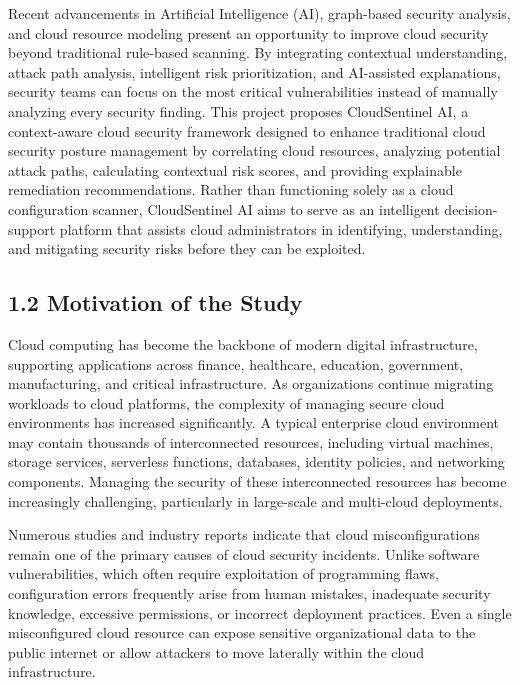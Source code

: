Recent advancements in Artificial Intelligence (AI), graph-based security analysis, and cloud resource modeling present an opportunity to improve cloud security beyond traditional rule-based scanning. By integrating contextual understanding, attack path analysis, intelligent risk prioritization, and AI-assisted explanations, security teams can focus on the most critical vulnerabilities instead of manually analyzing every security finding. This project proposes CloudSentinel AI, a context-aware cloud security framework designed to enhance traditional cloud security posture management by correlating cloud resources, analyzing potential attack paths, calculating contextual risk scores, and providing explainable remediation recommendations. Rather than functioning solely as a cloud configuration scanner, CloudSentinel AI aims to serve as an intelligent decision-support platform that assists cloud administrators in identifying, understanding, and mitigating security risks before they can be exploited.

\subsection{1.2 Motivation of the Study}

Cloud computing has become the backbone of modern digital infrastructure, supporting applications across finance, healthcare, education, government, manufacturing, and critical infrastructure. As organizations continue migrating workloads to cloud platforms, the complexity of managing secure cloud environments has increased significantly. A typical enterprise cloud environment may contain thousands of interconnected resources, including virtual machines, storage services, serverless functions, databases, identity policies, and networking components. Managing the security of these interconnected resources has become increasingly challenging, particularly in large-scale and multi-cloud deployments.

Numerous studies and industry reports indicate that cloud misconfigurations remain one of the primary causes of cloud security incidents. Unlike software vulnerabilities, which often require exploitation of programming flaws, configuration errors frequently arise from human mistakes, inadequate security knowledge, excessive permissions, or incorrect deployment practices. Even a single misconfigured cloud resource can expose sensitive organizational data to the public internet or allow attackers to move laterally within the cloud infrastructure.

